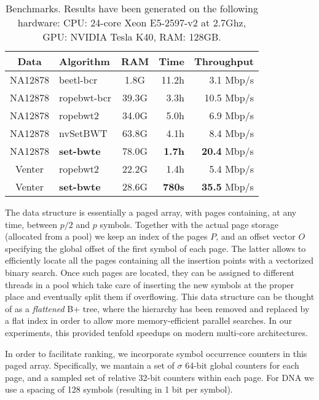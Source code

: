 \documentclass{acmsiggraph}
\begin{document}
\begin{table}[ht] 
	\centering
{
\begin{tabulary}{1.0\textwidth}{|c|l|c|r|r|}
\hline
Data & Algorithm & RAM & Time & Throughput \\
\hline
NA12878 & beetl-bcr & 1.8G & 11.2h & 3.1 Mbp/s \\
\hline
NA12878 & ropebwt-bcr & 39.3G & 3.3h & 10.5 Mbp/s \\
\hline
NA12878 & ropebwt2 & 34.0G & 5.0h & 6.9 Mbp/s \\
\hline
NA12878 & nvSetBWT & 63.8G & 4.1h & 8.4 Mbp/s \\
\hline
NA12878 & {\bf set-bwte} & 78.0G &  {\bf 1.7h} & {\bf 20.4} Mbp/s \\
\hline
Venter & ropebwt2 & 22.2G & 1.4h & 5.4 Mbp/s \\
\hline
Venter & {\bf set-bwte} & 28.6G & {\bf 780s} & {\bf 35.5} Mbp/s \\
\hline
\end{tabulary}
}
\caption{\label{Table:Benchmarks} Benchmarks. Results have been generated on the following hardware: CPU: 24-core Xeon E5-2597-v2 at 2.7Ghz, GPU: NVIDIA Tesla K40, RAM: 128GB. }\vspace*{-0.2cm}
\end{table}

The data structure is essentially a paged array, with pages containing, at any time, between $p/2$ and $p$ symbols. Together with the actual page storage (allocated from a pool) we keep an index of the pages $P$, and an offset vector $O$ specifying the global offset of the first symbol of each page.
The latter allows to efficiently locate all the pages containing all the insertion points with a vectorized binary search.
Once such pages are located, they can be assigned to different threads in a pool which take care
of inserting the new symbols at the proper place and eventually split them if overflowing.
This data structure can be thought of as a \emph{flattened} B+ tree, where the hierarchy has been removed and replaced by a flat index in order to allow more memory-efficient parallel searches.
In our experiments, this provided tenfold speedups on modern multi-core architectures.

In order to facilitate ranking, we incorporate symbol occurrence counters in this paged array. Specifically, we mantain a set of $\sigma$ 64-bit global counters for each page,
and a sampled set of relative 32-bit counters within each page. For DNA we use a spacing of 128 symbols (resulting in 1 bit per symbol).
\end{document}
